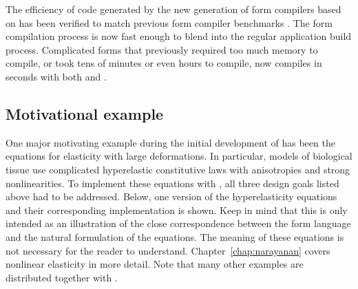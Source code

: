 The efficiency of code generated by the new generation of form compilers
based on \ufl{} has been verified to match previous form compiler
benchmarks \citep{AlnaesMardal2009b,OelgaardWells2010}.  The form
compilation process is now fast enough to blend into the regular
application build process.  Complicated forms that previously required
too much memory to compile, or took tens of minutes or even hours to
compile, now compiles in seconds with both \sfc{} and \ffc{}.

\subsection{Motivational example}
\label{ufl:sec:example}

One major motivating example during the initial development of \ufl{} has
been the equations for elasticity with large deformations.  In particular,
models of biological tissue use complicated hyperelastic constitutive
laws with anisotropies and strong nonlinearities.  To implement these
equations with \fenics{}, all three design goals listed above had to be
addressed. Below, one version of the hyperelasticity equations and their
corresponding \ufl{} implementation is shown.  Keep in mind that this is
only intended as an illustration of the close correspondence between the
form language and the natural formulation of the equations.  The meaning
of these equations is not necessary for the reader to understand.
Chapter~\ref{chap:narayanan} covers nonlinear elasticity in more detail.
Note that many other examples are distributed together with \ufl{}.

